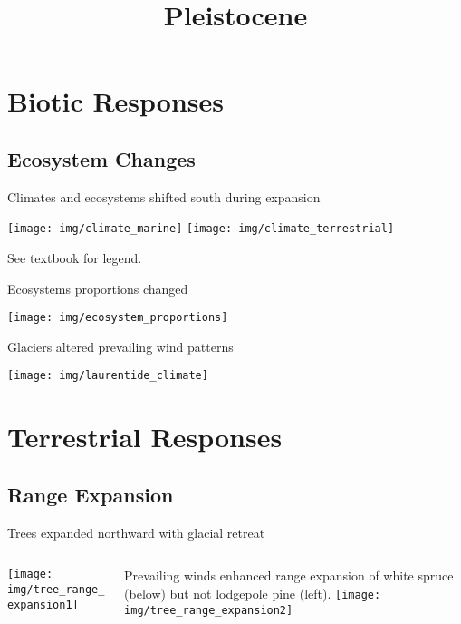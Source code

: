 \documentclass[xcolor=svgnames]{beamer}
\title{Pleistocene}
\begin{document}
\section{Biotic Responses}
\subsection{Ecosystem Changes}

\begin{frame}{Climates and ecosystems shifted south during expansion}
	\begin{center}
		\texttt{[image: img/climate\_marine]}\hspace*{1cm}
		\texttt{[image: img/climate\_terrestrial]}
	\end{center}
	{\hfill\tiny{See textbook for legend.}}
\end{frame}

\begin{frame}{Ecosystems proportions changed}
	\begin{center}
		\texttt{[image: img/ecosystem\_proportions]}
	\end{center}
\end{frame}

\begin{frame}{Glaciers altered prevailing wind patterns}
	\begin{center}
		\texttt{[image: img/laurentide\_climate]}
	\end{center}
\end{frame}

\section{Terrestrial Responses}
\subsection{Range Expansion}

\begin{frame}{Trees expanded northward with glacial retreat}
	\begin{columns}[T]
		\begin{column}{0.3\textwidth}
			\texttt{[image: img/tree\_range\_expansion1]}
		\end{column}
		\begin{column}{0.65\textwidth}
			Prevailing winds enhanced range expansion of white spruce (below) but not lodgepole pine (left).\vspace*{0.6\baselineskip}
			\texttt{[image: img/tree\_range\_expansion2]}
		\end{column}
	\end{columns}
\end{frame}
\end{document}
